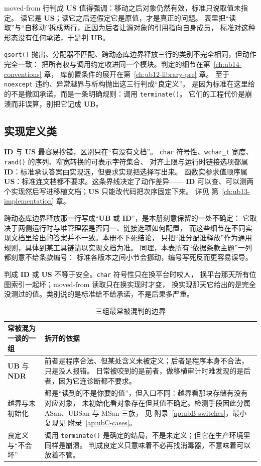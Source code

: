 \documentclass[12pt,a4paper,fontset=fandol]{ctexbook}
\newcommand{\Fn}[1]{\texttt{#1()}}
\newcommand{\Tp}[1]{\texttt{#1}}
\newcommand{\UB}{\textbf{\textsf{UB}}}
\newcommand{\IDB}{\textbf{\textsf{ID}}}
\newcommand{\USB}{\textbf{\textsf{US}}}
\newcommand{\NDR}{\textbf{\textsf{NDR}}}
\newcommand{\Mx}[1]{\textsf{#1}}
\begin{document}
moved-from 行判成 \USB{} 值得强调：移动之后对象仍然有效，标准只说取值未指定。
读它是 \USB{}；读它之后还假定它是原值，才是真正的问题。
表里把“读取”与“自移动”拆成两行，正因为后者让源对象的引用指向自身成员，
标准对这种形态没有任何承诺，于是判 \UB{}。

\Fn{qsort} 抛出、分配器不匹配、跨动态库边界释放三行的类别不完全相同，但动作完全一致：
把所有权与调用约定收进同一个模块。判定的细节在第~\ref{ch:ub14-conventions} 章，
库前置条件的展开在第~\ref{ch:ub12-library-pre} 章。
至于 \Tp{noexcept} 违约、异常越界与析构抛出这三行判成“良定义”，
是因为标准在这里给的不是撤回承诺，而是一条明确规则：调用 \Fn{terminate}。
它们的工程代价是崩溃而非误算，别把它记成 \UB{}。

\subsection{实现定义类}

\IDB{} 与 \USB{} 最容易抄错，区别只在“有没有文档”。
\Tp{char} 符号性、\Tp{wchar\_t} 宽度、\Fn{rand} 的序列、窄宽转换的可表示字符集合、
对齐上限与运行时链接选项都属 \IDB{}：标准承认答案由实现选，但要求实现把选择写出来。
函数实参求值顺序属 \USB{}：标准连文档都不要求。这条界线决定了动作差异——
\IDB{} 可以查、可以测两个实现然后写进移植文档；\USB{} 只能改代码把次序固定下来。
详见 第~\ref{ch:ub13-implementation} 章。

跨动态库边界释放那一行写成“\UB{} 或 \IDB{}”，是本册刻意保留的一处不确定：
它取决于两侧运行时与堆管理器是否同一、链接选项如何配置，
而这些细节在不同实现文档里给出的答案并不一致。本册不下死结论，
只把“谁分配谁释放”作为通用规则，具体到某工具链请以实现文档为准。
同理，本表所有“依据条款主题”一列都刻意不给条款编号：
标准各版本之间小节会挪动，编号写死反而更容易误导。

\begin{warning}[title=类别与严重性无关]
判成 \IDB{} 或 \USB{} 不等于安全。\Tp{char} 符号性只在换平台时咬人，
换平台那天所有位图索引一起坏；moved-from 读取只在换实现时才变，
换实现那天它给出的是完全没测过的值。类别说的是标准给不给承诺，不是后果多严重。
\end{warning}

\begin{table}[htbp]
\centering
\begin{tabularx}{0.80\textwidth}{@{}>{\raggedright\arraybackslash}p{} X@{}}
\toprule
常被混为一谈的一组 & 拆开的依据 \\
\midrule
\UB{} 与 \NDR{} & 前者是程序合法、但某处含义未被定义；后者是程序本身不合法，只是没人报错。
日常被咬到的是前者，做移植审计时难发现的是后者，因为它连诊断都不要求。 \\
越界与未初始化 & 都是“读到的不是你要的值”，但入口不同：越界看那块存储有没有对应对象，
未初始化看对象存在但其值不确定。检测手段因此分属 \Mx{ASan}、\Mx{UBSan} 与 \Mx{MSan} 三族，
见 附录~\ref{ap:ubB-switches}，最小复现见 附录~\ref{ap:ubC-cases}。 \\
良定义与“不会坏” & 调用 \Fn{terminate} 是确定的结局，不是未定义；但它在生产环境里同样是崩溃。
判成良定义只意味着不必再找消毒器，不意味着可以放着不管。 \\
\bottomrule
\end{tabularx}
\caption{三组最常被混判的边界}\label{tab:apA-border}
\end{table}
\end{document}
